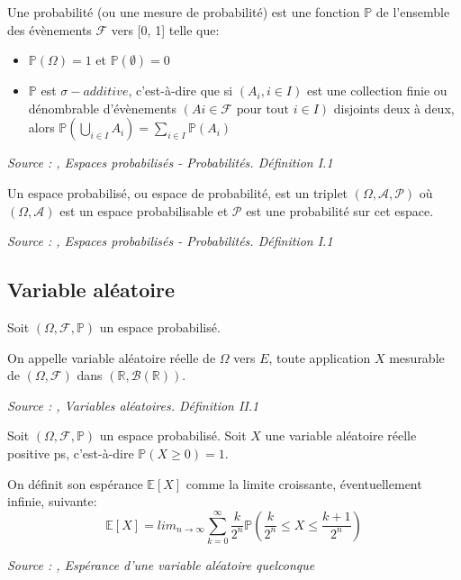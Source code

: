 \begin{definition}\label{Probabilité}
Une probabilité (ou une mesure de probabilité) est une fonction
$\mathbb{P}$ de l’ensemble des évènements $\mathcal{F}$ vers [0, 1] telle que:
    \begin{itemize}
        \item $\mathbb{P}(\Omega) = 1$ et $\mathbb{P}(\emptyset) = 0$
        \item $\mathbb{P}$ est $\sigma-additive$, c'est-à-dire que si $(A_i, i \in I)$ est une collection finie ou dénombrable d’évènements $(Ai \in \mathcal{F} \text{ pour tout } i \in I)$ disjoints deux à deux, alors $\mathbb{P}(\bigcup_{i \in I} A_i) = \sum_{i \in I}\mathbb{P}(A_i)$
    \end{itemize}

\noindent\textit{Source : \cite{ensta_cours},  Espaces probabilisés - Probabilités. Définition I.1}
\end{definition}

\begin{definition}\label{def:espace_probabilise}
Un espace probabilisé, ou espace de probabilité, est un triplet $(\Omega, \mathcal{A}, \mathcal{P})$
où $(\Omega, \mathcal{A})$ est un espace probabilisable et $\mathcal{P}$ est une probabilité sur cet espace.

\noindent\textit{Source : \cite{ensta_cours},  Espaces probabilisés - Probabilités. Définition I.1}
\end{definition}



\subsection{Variable aléatoire}

Soit $(\Omega, \mathcal{F}, \mathbb{P})$ un espace probabilisé. 

\begin{definition}\label{def:variable_aleatoire}
On appelle variable aléatoire réelle de $\Omega$ vers $E$, toute application $X$ mesurable de $(\Omega, \mathcal{F})$ dans $(\mathbb{R}, \mathcal{B}(\mathbb{R}))$.

\noindent\textit{Source : \cite{ensta_cours},  Variables aléatoires. Définition II.1}
\end{definition}

\begin{definition}\label{def:esperance}
Soit $(\Omega, \mathcal{F}, \mathbb{P})$ un espace probabilisé. Soit $X$ une variable aléatoire réelle positive \gls{ps}, c'est-à-dire $\mathbb{P}(X \ge 0) = 1.$

On définit son espérance $\mathbb{E}[X]$ comme la limite croissante, éventuellement infinie, suivante:
$$\mathbb{E}[X] = lim_{n\rightarrow\infty}\sum^{\infty}_{k = 0}\frac{k}{2^n}\mathbb{P}(\frac{k}{2^n} \le X \le \frac{k + 1}{2^n})$$

\noindent\textit{Source : \cite{ensta_cours},  Espérance d’une variable aléatoire quelconque}
\end{definition}

